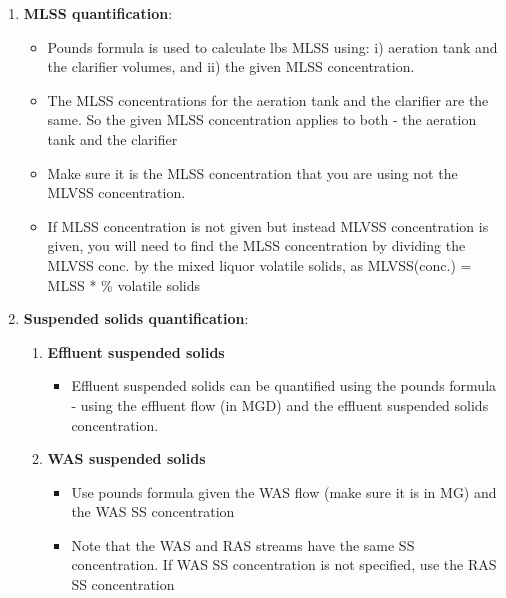 \begin{enumerate}
\item \textbf{MLSS quantification}:\\ 
\begin{itemize}
\item Pounds formula is used to calculate lbs MLSS using: i) aeration tank and the clarifier volumes, and ii) the given MLSS concentration.  
\item The MLSS concentrations for the aeration tank and the clarifier are the same.  So the given MLSS concentration applies to both - the aeration tank and the clarifier
\item Make sure it is the MLSS concentration that you are using not the MLVSS concentration.  
\item If MLSS concentration is not given but instead MLVSS concentration is given, you will need to find the MLSS concentration by dividing the MLVSS conc. by the mixed liquor volatile solids, as MLVSS(conc.) = MLSS * \% volatile solids
\end{itemize}

\item \textbf{Suspended solids quantification}:\\ 
\begin{enumerate}
\item \textbf{Effluent suspended solids}
\begin{itemize}
\item Effluent suspended solids can be quantified using the pounds formula - using the effluent flow (in MGD) and the effluent suspended solids concentration.
\end{itemize}
\item \textbf{WAS suspended solids}
\begin{itemize}
\item Use pounds formula given the WAS flow (make sure it is in MG) and the WAS SS concentration
\item Note that the WAS and RAS streams have the same SS concentration.  If WAS SS concentration is not specified, use the RAS SS concentration
\end{itemize}
\end{enumerate}
\end{enumerate} 

